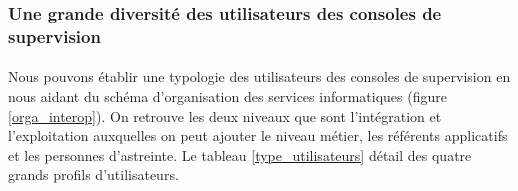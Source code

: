 		\subsubsection{Une grande diversité des utilisateurs des consoles de
		supervision}
			\paragraph{}%
			Nous pouvons établir une typologie des utilisateurs des consoles de
			supervision en nous aidant du schéma d’organisation
			des services informatiques (figure \ref{orga_interop}). On retrouve les
			deux niveaux que sont l’intégration et l’exploitation auxquelles on peut
			ajouter le niveau métier, les référents applicatifs et les personnes
			d'astreinte.
			Le tableau \ref{type_utilisateurs} détail des quatre grands profils d’utilisateurs.
